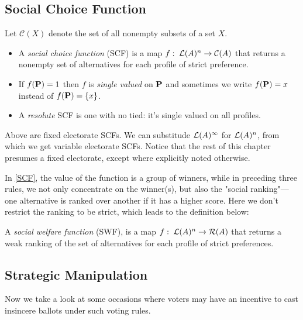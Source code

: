 \subsection{Social Choice Function}

Let $\mathcal{C}(X)$ denote the set of all nonempty subsets of a set $X$.

\begin{definition}
    \label{SCF}
    \begin{itemize}
        \item A \textit{social choice function} (SCF) is a map $f:\; \mathcal{L}(A)^n \to \mathcal{C}(A)$ that returns a nonempty set of alternatives for each profile of strict preference.
        \item If $f(\mathbf{P}) = 1$ then $f$ is \textit{single valued} on $\mathbf{P}$ and sometimes we write $f(\mathbf{P}) = x$ instead of $f(\mathbf{P}) = \{x\}$.
        \item A \textit{resolute} SCF is one with no tied: it's single valued on all profiles.
    \end{itemize}
\end{definition}

Above are fixed electorate SCFs. We can substitude $\mathcal{L}(A)^\infty$ for $\mathcal{L}(A)^n$, from which we get variable electorate SCFs. Notice that the rest of this chapter presumes a fixed electorate, except where explicitly noted otherwise.

In \cref{SCF}, the value of the function is a group of winners, while in preceding three rules, we not only concentrate on the winner(s), but also the "social ranking"---one alternative is ranked over another if it has a higher score. Here we don't restrict the ranking to be strict, which leads to the definition below:

\begin{definition}
    A \textit{social welfare function} (SWF), is a map $f:\; \mathcal{L}(A)^n \to \mathcal{R}(A)$ that returns a weak ranking of the set of alternatives for each profile of strict preferences.
\end{definition}

\subsection{Strategic Manipulation}

Now we take a look at some occasions where voters may have an incentive to cast insincere ballots under such voting rules.

